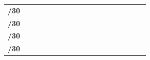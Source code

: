\documentclass[11pt,a4paper]{report}
\begin{document}
\begin{center}
\begin{longtable}{rlcccccccccccccccc}
                \textbf{/30}                                                                                             &                       &                           &                           &                           &                           &                           &                            & \cellcolor[HTML]{C09FE5}   & \cellcolor[HTML]{C09FE5}   &                                 &                                 &                                 &                                 &                                 &                                 &                                  &                                 \\
                \textbf{/30}                                                                                             &                       &                           &                           &                           &                           & \cellcolor[HTML]{C09FE5}  & \cellcolor[HTML]{C09FE5}   &                            &                            &                                 &                                 &                                 &                                 &                                 &                                 &                                  &                                 \\
                \textbf{/30}                                                                                             &                       &                           &                           & \cellcolor[HTML]{C09FE5}  & \cellcolor[HTML]{C09FE5}  &                           &                            &                            &                            &                                 &                                 &                                 &                                 &                                 &                                 &                                  &                                 \\
                \textbf{/30}                                                                                             &                       & \cellcolor[HTML]{C09FE5}  & \cellcolor[HTML]{C09FE5}  &                           &                           &                           &                            &                            &                            &                                 &                                 &                                 &                                 &                                 &                                 &                                  &                                 \\ \cline{1-1} \cline{3-18} 

\end{longtable}
\end{center}
\end{document}
